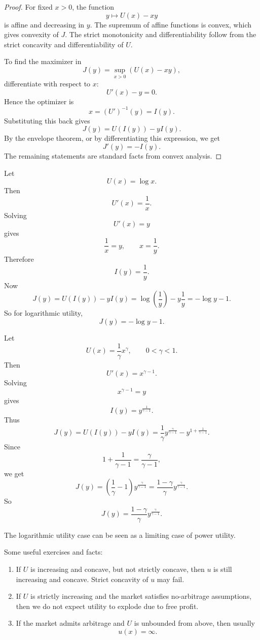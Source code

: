 \begin{proof}
For fixed $x>0$, the function
\[
    y\mapsto U(x)-xy
\]
is affine and decreasing in $y$. The supremum of affine functions is convex, which gives convexity of $J$. The strict monotonicity and differentiability follow from the strict concavity and differentiability of $U$.

To find the maximizer in
\[
    J(y)=\sup_{x>0}(U(x)-xy),
\]
differentiate with respect to $x$:
\[
    U'(x)-y=0.
\]
Hence the optimizer is
\[
    x=(U')^{-1}(y)=I(y).
\]
Substituting this back gives
\[
    J(y)=U(I(y))-yI(y).
\]
By the envelope theorem, or by differentiating this expression, we get
\[
    J'(y)=-I(y).
\]
The remaining statements are standard facts from convex analysis.
\end{proof}

\begin{primer}
Let
\[
    U(x)=\log x.
\]
Then
\[
    U'(x)=\frac{1}{x}.
\]
Solving
\[
    U'(x)=y
\]
gives
\[
    \frac{1}{x}=y,
    \qquad
    x=\frac{1}{y}.
\]
Therefore
\[
    I(y)=\frac{1}{y}.
\]
Now
\[
    J(y)
    =
    U(I(y))-yI(y)
    =
    \log\left(\frac{1}{y}\right)-y\frac{1}{y}
    =
    -\log y-1.
\]
So for logarithmic utility,
\[
    J(y)=-\log y-1.
\]
\end{primer}

\begin{primer}
Let
\[
    U(x)=\frac{1}{\gamma}x^\gamma,
    \qquad 0<\gamma<1.
\]
Then
\[
    U'(x)=x^{\gamma-1}.
\]
Solving
\[
    x^{\gamma-1}=y
\]
gives
\[
    I(y)=y^{\frac{1}{\gamma-1}}.
\]
Thus
\[
    J(y)
    =
    U(I(y))-yI(y)
    =
    \frac{1}{\gamma}y^{\frac{\gamma}{\gamma-1}}
    -
    y^{1+\frac{1}{\gamma-1}}.
\]
Since
\[
    1+\frac{1}{\gamma-1}
    =
    \frac{\gamma}{\gamma-1},
\]
we get
\[
    J(y)
    =
    \left(\frac{1}{\gamma}-1\right)y^{\frac{\gamma}{\gamma-1}}
    =
    \frac{1-\gamma}{\gamma}
    y^{\frac{\gamma}{\gamma-1}}.
\]
So
\[
    J(y)=\frac{1-\gamma}{\gamma}y^{\frac{\gamma}{\gamma-1}}.
\]
\end{primer}

\begin{opomba}
The logarithmic utility case can be seen as a limiting case of power utility.
\end{opomba}

\begin{naloga}
Some useful exercises and facts:
\begin{enumerate}
    \item If $U$ is increasing and concave, but not strictly concave, then $u$ is still increasing and concave. Strict concavity of $u$ may fail.
    \item If $U$ is strictly increasing and the market satisfies no-arbitrage assumptions, then we do not expect utility to explode due to free profit.
    \item If the market admits arbitrage and $U$ is unbounded from above, then usually
    \[
        u(x)=\infty.
    \]
\end{enumerate}
\end{naloga}

